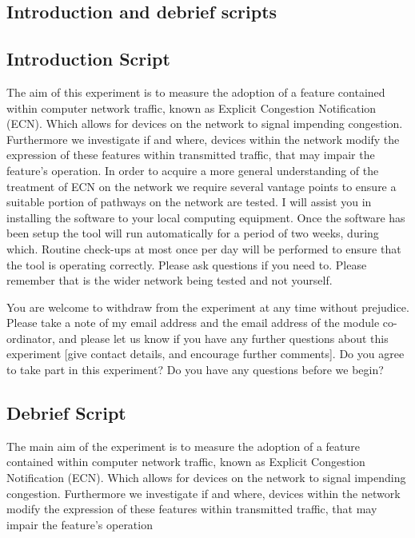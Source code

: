 \documentclass{l4proj}
\begin{document}
\begin{appendices}

\chapter{Introduction and debrief scripts}

\section{Introduction Script}

The aim of this experiment is to measure the adoption of a feature contained within computer network traffic, known as Explicit Congestion Notification (ECN). Which allows for devices on the network to signal impending congestion. Furthermore we investigate if and where, devices within the network modify the expression of these features within transmitted traffic, that may impair the feature’s operation. In order to acquire a more general understanding of the treatment of ECN on the network we require several vantage points to ensure a suitable portion of pathways on the network are tested. I will assist you in installing the software to your local computing equipment. Once the software has been setup the tool will run automatically for a period of two weeks, during which. Routine check-ups at most once per day will be performed to ensure that the tool is operating correctly. Please ask questions if you need to. Please remember that is the wider network being tested and not yourself. 

You are welcome to withdraw from the experiment at any time without prejudice. Please take a note of my email address and the email address of  the module co-ordinator, and please let us know if you have any further questions about this experiment [give contact details, and encourage further comments]. Do you agree to take part in this experiment? Do you have any questions before we begin?
\clearpage
\section{Debrief Script}

The main aim of the experiment is to  measure the adoption of a feature contained within computer network traffic, known as Explicit Congestion Notification (ECN). Which allows for devices on the network to signal impending congestion. Furthermore we investigate if and where, devices within the network modify the expression of these features within transmitted traffic, that may impair the feature’s operation


\end{appendices}
\end{document}
